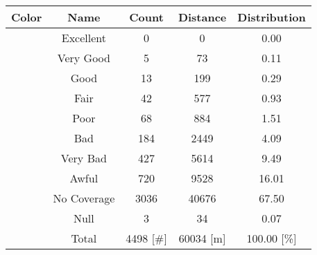 \begin{tabular}{|c|c|c|c|c|}\hline
\rowcolor{Plum!20}
Color&Name&Count&Distance&Distribution\\\hline\hline
\cellcolor[HTML]{00703c} &Excellent&0&0&0.00\\\hline
\cellcolor[HTML]{00a032} &Very Good&5&73&0.11\\\hline
\cellcolor[HTML]{00d228} &Good&13&199&0.29\\\hline
\cellcolor[HTML]{ffff00} &Fair&42&577&0.93\\\hline
\cellcolor[HTML]{ffaa00} &Poor&68&884&1.51\\\hline
\cellcolor[HTML]{fa6400} &Bad&184&2449&4.09\\\hline
\cellcolor[HTML]{dc143c} &Very Bad&427&5614&9.49\\\hline
\cellcolor[HTML]{820000} &Awful&720&9528&16.01\\\hline
\cellcolor[HTML]{aaaaaa} &No Coverage&3036&40676&67.50\\\hline
\cellcolor[HTML]{000000} &Null&3&34&0.07\\\hline
\cellcolor[HTML]{ffffff} &Total&4498 [\#]&60034 [m]&100.00 [\%]\\\hline
\end{tabular}
